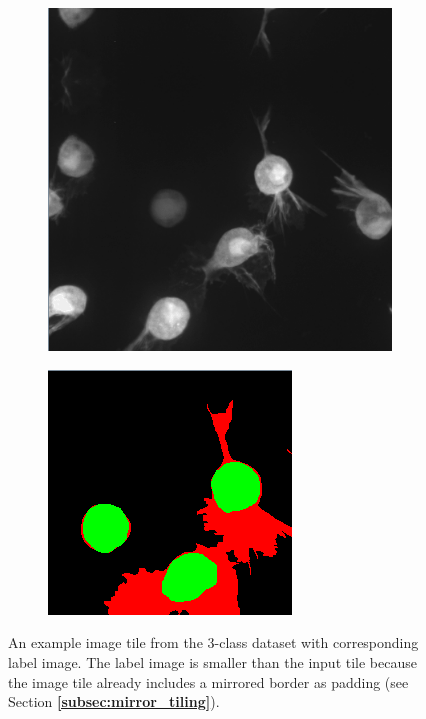 \begin {figure}[!ht]
	
	\begin {subfigure}[{position=b}]{0.6\linewidth}
		\begin {center}
		\includegraphics[scale=0.65]{img/dataset_ex1.png}
		\end{center}
	\end {subfigure}
	\begin {subfigure}[{position=b}]{0.3\linewidth}
		\begin {center}
		\includegraphics[scale=0.60]{img/dataset_ex2.png}
		\end{center}
	\end {subfigure}

		\caption[An example image tile from the 3-class dataset.]{An example image tile from the 3-class dataset with corresponding label image. The label image is smaller than the input tile because the image tile already includes a mirrored border as padding (see Section \textbf{\ref{subsec:mirror_tiling}}).}
		\label{fig:dataset_example}
	

\end {figure}

